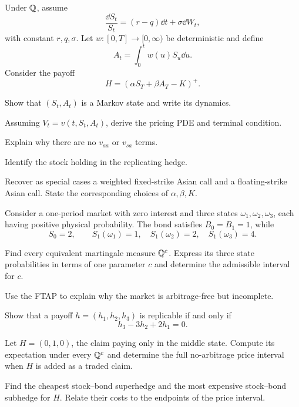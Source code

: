 \begin{exercise}
Under \(\mathbb Q\), assume
\[
\frac{\dd S_t}{S_t}=(r-q)\dd t+\sigma\dd W_t,
\]
with constant \(r,q,\sigma\). Let \(w:[0,T]\to[0,\infty)\) be deterministic
and define
\[
A_t=\int_0^t w(u)S_u\dd u.
\]
Consider the payoff
\[
H=(\alpha S_T+\beta A_T-K)^+.
\]
\begin{exparts}
  \item Show that \((S_t,A_t)\) is a Markov state and write its dynamics.
  \item Assuming \(V_t=v(t,S_t,A_t)\), derive the pricing PDE and terminal
  condition.
  \item Explain why there are no \(v_{aa}\) or \(v_{sa}\) terms.
  \item Identify the stock holding in the replicating hedge.
  \item Recover as special cases a weighted fixed-strike Asian call and a
  floating-strike Asian call. State the corresponding choices of
  \(\alpha,\beta,K\).
\end{exparts}
\end{exercise}

\begin{exercise}
Consider a one-period market with zero interest and three states
\(\omega_1,\omega_2,\omega_3\), each having positive physical probability.
The bond satisfies \(B_0=B_1=1\), while
\[
S_0=2,
\qquad
S_1(\omega_1)=1,\quad
S_1(\omega_2)=2,\quad
S_1(\omega_3)=4.
\]
\begin{exparts}
  \item Find every equivalent martingale measure
  \(\mathbb Q^c\). Express its three state probabilities in terms of one
  parameter \(c\) and determine the admissible interval for \(c\).
  \item Use the FTAP to explain why the market is arbitrage-free but
  incomplete.
  \item Show that a payoff \(h=(h_1,h_2,h_3)\) is replicable if and only if
  \[
  h_3-3h_2+2h_1=0.
  \]
  \item Let \(H=(0,1,0)\), the claim paying only in the middle state.
  Compute its expectation under every \(\mathbb Q^c\) and determine the full
  no-arbitrage price interval when \(H\) is added as a traded claim.
  \item Find the cheapest stock--bond superhedge and the most expensive
  stock--bond subhedge for \(H\). Relate their costs to the endpoints of the
  price interval.
\end{exparts}
\end{exercise}

